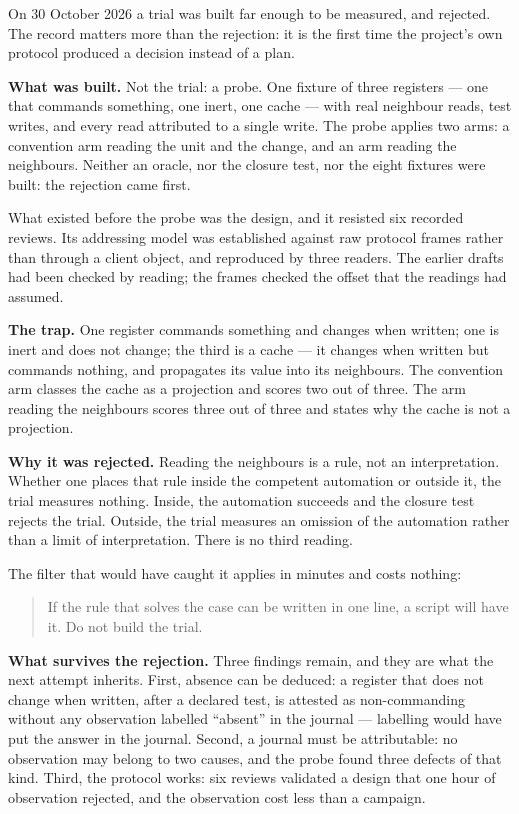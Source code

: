 On 30 October 2026 a trial was built far enough to be measured, and rejected. The
record matters more than the rejection: it is the first time the project's own
protocol produced a decision instead of a plan.

\textbf{What was built.} Not the trial: a probe. One fixture of three registers ---
one that commands something, one inert, one cache --- with real neighbour reads, test
writes, and every read attributed to a single write. The probe applies two arms: a
convention arm reading the unit and the change, and an arm reading the neighbours.
Neither an oracle, nor the closure test, nor the eight fixtures were built: the
rejection came first.

What existed before the probe was the design, and it resisted six recorded reviews.
Its addressing model was established against raw protocol frames rather than through
a client object, and reproduced by three readers. The earlier drafts had been
checked by reading; the frames checked the offset that the readings had assumed.

\textbf{The trap.} One register commands something and changes when written; one is
inert and does not change; the third is a cache --- it changes when written but
commands nothing, and propagates its value into its neighbours. The convention arm
classes the cache as a projection and scores two out of three. The arm reading the
neighbours scores three out of three and states why the cache is not a projection.

\textbf{Why it was rejected.} Reading the neighbours is a rule, not an
interpretation. Whether one places that rule inside the competent automation or
outside it, the trial measures nothing. Inside, the automation succeeds and the
closure test rejects the trial. Outside, the trial measures an omission of the
automation rather than a limit of interpretation. There is no third reading.

The filter that would have caught it applies in minutes and costs nothing:

\begin{quote}
If the rule that solves the case can be written in one line, a script will have
it. Do not build the trial.
\end{quote}

\textbf{What survives the rejection.} Three findings remain, and they are what the
next attempt inherits. First, absence can be deduced: a register that does not
change when written, after a declared test, is attested as non-commanding without
any observation labelled ``absent'' in the journal --- labelling would have put the
answer in the journal. Second, a journal must be attributable: no observation may
belong to two causes, and the probe found three defects of that kind. Third, the
protocol works: six reviews validated a design that one hour of observation
rejected, and the observation cost less than a campaign.

